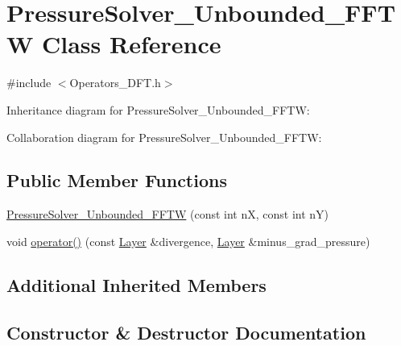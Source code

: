 \hypertarget{class_pressure_solver___unbounded___f_f_t_w}{}\section{Pressure\+Solver\+\_\+\+Unbounded\+\_\+\+F\+F\+T\+W Class Reference}
\label{class_pressure_solver___unbounded___f_f_t_w}


{\ttfamily \#include $<$Operators\+\_\+\+D\+F\+T.\+h$>$}



Inheritance diagram for Pressure\+Solver\+\_\+\+Unbounded\+\_\+\+F\+F\+T\+W\+:


Collaboration diagram for Pressure\+Solver\+\_\+\+Unbounded\+\_\+\+F\+F\+T\+W\+:
\subsection*{Public Member Functions}
\begin{DoxyCompactItemize}
\item 
\hyperlink{class_pressure_solver___unbounded___f_f_t_w_aa0bfff0b7b654eb5a258535eb91e016a}{Pressure\+Solver\+\_\+\+Unbounded\+\_\+\+F\+F\+T\+W} (const int n\+X, const int n\+Y)
\item 
void \hyperlink{class_pressure_solver___unbounded___f_f_t_w_af38fd881b74dd1d7c8e251156b0eae2c}{operator()} (const \hyperlink{struct_layer}{Layer} \&divergence, \hyperlink{struct_layer}{Layer} \&minus\+\_\+grad\+\_\+pressure)
\end{DoxyCompactItemize}
\subsection*{Additional Inherited Members}


\subsection{Constructor \& Destructor Documentation}
\hypertarget{class_pressure_solver___unbounded___f_f_t_w_aa0bfff0b7b654eb5a258535eb91e016a}{}
